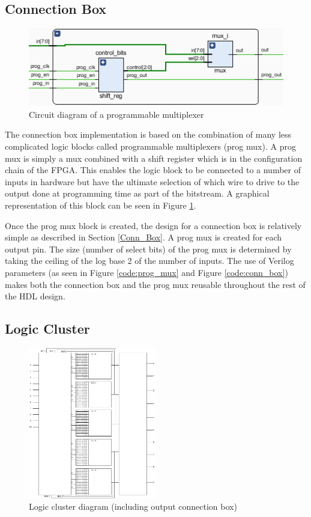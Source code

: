 \documentclass[12pt]{article}
\begin{document}
\subsection{Connection Box}

\begin{figure}[ht]
    \centering
    \includegraphics[width=\textwidth]{prog_mux}
    \caption{Circuit diagram of a programmable multiplexer}
    \label{fig:prog_mux}
\end{figure}

The connection box implementation is based on the combination of many less complicated
logic blocks called programmable multiplexers (prog mux). A prog mux is simply a mux combined with
a shift register which is in the configuration chain of the FPGA. This enables the logic
block to be connected to a number of inputs in hardware but have the ultimate selection
of which wire to drive to the output done at programming time as part of the bitstream. 
A graphical representation of this block can be seen in Figure \ref{fig:prog_mux}.

Once the prog mux block is created, the design for a connection box is relatively simple
as described in Section \ref{Conn_Box}. A prog mux is created for each output pin. The
size (number of select bits) of the prog mux is determined by taking the ceiling of
the log base 2 of the number of inputs.
The use of Verilog parameters (as seen in Figure \ref{code:prog_mux} and Figure \ref{code:conn_box})
makes both the connection box and the prog mux reusable
throughout the rest of the HDL design.

\subsection{Logic Cluster}

\begin{figure}[ht]
    \centering
    \includegraphics[width=0.5\textwidth]{LogicCluster}
    \caption{Logic cluster diagram (including output connection box)}
    \label{fig:logic_cluster}
\end{figure}
\end{document}
